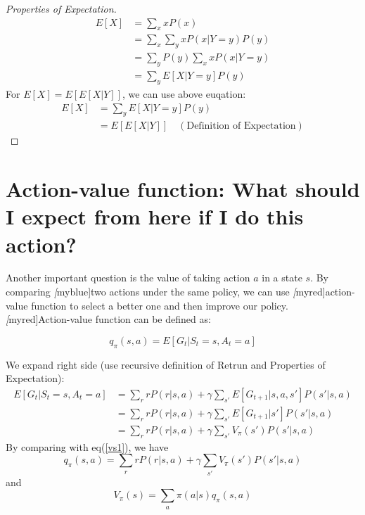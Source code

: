     \begin{proof}[Properties of Expectation]
        \begin{align*}
            E[X] & = \sum_{x}xP(x) \\
                 & = \sum_{x}\sum_{y}xP(x|Y=y)P(y) \\
                 & = \sum_{y}P(y)\sum_{x}xP(x|Y=y) \\
                 & = \sum_{y}E[X|Y=y]P(y)
        \end{align*}
        For $E[X] = E[E[X|Y]]$, we can use above euqation:
        \begin{align*}
            E[X] & = \sum_{y}E[X|Y=y]P(y) \\
                 & = E[E[X|Y]] \quad (\text{Definition of Expectation})
        \end{align*}

    \end{proof}
    \section{Action-value function: What should I expect from here if I do this action?}
    Another important question is the value of taking action $a$ in a state $s$. By comparing \emph[myblue]{two actions under the same policy}, we can use \emph[myred]{action-value function} to select a better one and then improve our policy. \\
    \emph[myred]{Action-value function} can be defined as:
    \begin{definition}
        \begin{equation}
            q_{\pi}(s,a)=E[G_{t}|S_t=s, A_t=a]
        \end{equation}
    \end{definition}
    We expand right side (use recursive definition of Retrun and Properties of Expectation):
    \begin{align*}
        E[G_t|S_t=s, A_t=a] & = \sum_rrP(r|s,a) + \gamma \sum_{s'}E[G_{t+1}|s,a,s']P(s'|s,a) \\
                            & = \sum_rrP(r|s,a) + \gamma \sum_{s'}E[G_{t+1}|s']P(s'|s,a) \\
                            & = \sum_rrP(r|s,a) + \gamma \sum_{s'}V_{\pi}(s')P(s'|s,a)
    \end{align*}
    By comparing with eq(\ref{vs1}), we have
    \begin{equation}\label{qa1}
        q_{\pi}(s,a)= \sum_rrP(r|s,a) + \gamma \sum_{s'}V_{\pi}(s')P(s'|s,a)
    \end{equation}
    and
    \begin{equation}\label{vs2}
        V_{\pi}(s)=\sum_{a}\pi(a|s)q_{\pi}(s,a)
    \end{equation} 

